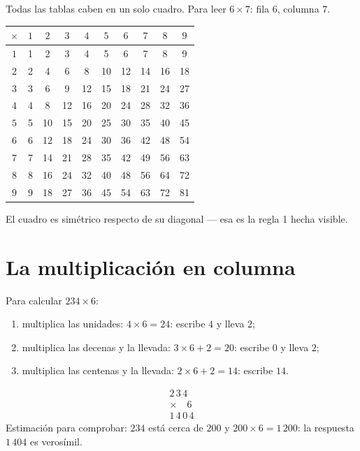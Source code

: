\begin{example}\label{ex:g3:mult:table}
Todas las tablas caben en un solo cuadro. Para leer $6 \times 7$: fila $6$,
columna $7$.
\begin{center}
\renewcommand{\arraystretch}{1.15}
\begin{tabular}{c|ccccccccc}
$\times$ & $1$ & $2$ & $3$ & $4$ & $5$ & $6$ & $7$ & $8$ & $9$ \\
\hline
$1$ & 1 & 2 & 3 & 4 & 5 & 6 & 7 & 8 & 9 \\
$2$ & 2 & 4 & 6 & 8 & 10 & 12 & 14 & 16 & 18 \\
$3$ & 3 & 6 & 9 & 12 & 15 & 18 & 21 & 24 & 27 \\
$4$ & 4 & 8 & 12 & 16 & 20 & 24 & 28 & 32 & 36 \\
$5$ & 5 & 10 & 15 & 20 & 25 & 30 & 35 & 40 & 45 \\
$6$ & 6 & 12 & 18 & 24 & 30 & 36 & 42 & 48 & 54 \\
$7$ & 7 & 14 & 21 & 28 & 35 & 42 & 49 & 56 & 63 \\
$8$ & 8 & 16 & 24 & 32 & 40 & 48 & 56 & 64 & 72 \\
$9$ & 9 & 18 & 27 & 36 & 45 & 54 & 63 & 72 & 81 \\
\end{tabular}
\end{center}
El cuadro es simétrico respecto de su diagonal --- esa es la regla 1 hecha
visible.
\end{example}

\section{La multiplicación en columna}

\begin{method}\label{met:g3:mult:column}
Para calcular $234 \times 6$:
\begin{enumerate}
  \item multiplica las unidades: $4 \times 6 = 24$: escribe $4$ y lleva $2$;
  \item multiplica las decenas y  la llevada:
        $3 \times 6 + 2 = 20$: escribe $0$ y lleva $2$;
  \item multiplica las centenas y  la llevada:
        $2 \times 6 + 2 = 14$: escribe $14$.
\end{enumerate}
\[
\begin{array}{r}
2\,3\,4 \\
\times \quad 6 \\
\hline
1\,4\,0\,4
\end{array}
\]
Estimación para comprobar: $234$ está cerca de $200$ y
$200 \times 6 = 1\,200$: la respuesta $1\,404$ es verosímil.
\end{method}

